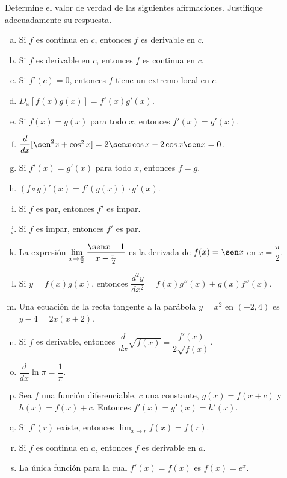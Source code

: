 \begin{prob}
Determine el valor de verdad de las siguientes afirmaciones. Justifique adecuadamente su respuesta. 
\begin{enumerate}[a)]
    \item Si $f$ es continua en $c$, entonces $f$ es derivable en $c$.
    \item Si $f$ es derivable en $c$, entonces $f$ es continua en $c$.
    \item Si $f'(c)=0$, entonces $f$ tiene un extremo local en $c$.
    \item $D_x[f(x)g(x)] = f'(x)g'(x)$.
    \item Si $f(x)=g(x)$ para todo $x$, entonces $f'(x)=g'(x)$.
    \item $\dfrac{d}{dx}[\sen^2 x + \cos^2 x] = 2\sen x\cos x -
    2\cos x\sen x = 0$.
    \item Si $f'(x) = g'(x)$ para todo $x$, entonces $f=g$.
    \item $(f\circ g)'(x) = f'(g(x))\cdot g'(x)$.
    \item Si $f$ es par, entonces $f'$ es impar.
    \item Si $f$ es impar, entonces $f'$ es par.
    \item La expresión
    $\displaystyle\lim_{x\to\frac{\pi}{2}}
    \frac{\sen x-1}{x-\frac{\pi}{2}}$
    es la derivada de $f(x)=\sen x$ en $x=\dfrac{\pi}{2}$.

    \item Si $y=f(x)g(x)$, entonces
    $\dfrac{d^2y}{dx^2}=f(x)g''(x)+g(x)f''(x)$.

    \item Una ecuación de la recta tangente a la parábola
    $y=x^2$ en $(-2,4)$ es $y-4=2x(x+2)$.

    \item Si $f$ es derivable, entonces
    $\dfrac{d}{dx}\sqrt{f(x)}=\dfrac{f'(x)}{2\sqrt{f(x)}}$.

    \item $\dfrac{d}{dx}\ln\pi=\dfrac{1}{\pi}$.

    \item Sea $f$ una función diferenciable, $c$ una constante,
    $g(x)=f(x+c)$ y $h(x)=f(x)+c$.
    Entonces $f'(x)=g'(x)=h'(x)$.

    \item Si $f'(r)$ existe, entonces
    $\displaystyle\lim_{x\to r}f(x)=f(r)$.

    \item Si $f$ es continua en $a$, entonces $f$ es derivable en $a$.

    \item La única función para la cual $f'(x)=f(x)$ es $f(x)=e^x$.

\end{enumerate}
\end{prob}

